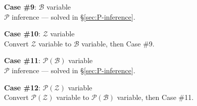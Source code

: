 \textbf{Case \#9}: $\mathcal{B}$ variable\\
$\mathcal{P}$ inference --- solved in \S\ref{sec:P-inference}.

\textbf{Case \#10}: $\mathcal{Z}$ variable\\
Convert $\mathcal{Z}$ variable to $\mathcal{B}$ variable, then Case \#9.

\textbf{Case \#11}: $\mathcal{P}(\mathcal{B})$ variable\\
$\mathcal{P}$ inference --- solved in \S\ref{sec:P-inference}.

\textbf{Case \#12}: $\mathcal{P}(\mathcal{Z})$ variable\\
Convert $\mathcal{P}(\mathcal{Z})$ variable to $\mathcal{P}(\mathcal{B})$ variable, then Case \#11.


%

%

